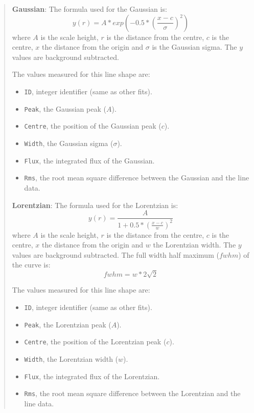 \documentclass[twoside,11pt]{article}
\renewcommand{\_}{\texttt{\symbol{95}}}
\newcommand{\labelitem}[1]{\textbf{#1}}
\newcommand{\hitext}[1]{\texttt{#1}}
\begin{document}
\begin{quote}
 \labelitem{Gaussian}: The formula used for the Gaussian is:
 \[
  y(r) = A * exp\left( -0.5 * \left(\frac{x-c}{\sigma}\right)^{2}\right)
 \]
 where $A$ is the scale height, $r$ is the distance from the centre,
 $c$ is the centre, $x$ the distance from the origin and $\sigma$ is
 the Gaussian sigma. The $y$ values are background subtracted.

 The values measured for this line shape are:
 \begin{itemize}
   \item \hitext{ID}, integer identifier (same as other fits).
   \item \hitext{Peak}, the Gaussian peak ($A$).
   \item \hitext{Centre}, the position of the Gaussian peak ($c$).
   \item \hitext{Width}, the Gaussian sigma ($\sigma$).
   \item \hitext{Flux}, the integrated flux of the Gaussian.
   \item \hitext{Rms}, the root mean square difference between the
         Gaussian and the line data.
 \end{itemize}

 \labelitem{Lorentzian}: The formula used for the Lorentzian is:
 \[
  y(r) = \frac{A}{1+0.5*(\frac{x-c}{w})^{2}}
 \]
 where $A$ is the scale height, $r$ is the distance from the centre,
 $c$ is the centre, $x$ the distance from the origin and $w$ the
 Lorentzian width. The $y$ values are background subtracted. The full
 width half maximum ($fwhm$) of the curve is:
 \[
 fwhm = w*2\sqrt{2}
 \]

 The values measured for this line shape are:
 \begin{itemize}
   \item \hitext{ID}, integer identifier (same as other fits).
   \item \hitext{Peak}, the Lorentzian peak ($A$).
   \item \hitext{Centre}, the position of the Lorentzian peak ($c$).
   \item \hitext{Width}, the Lorentzian width ($w$).
   \item \hitext{Flux}, the integrated flux of the Lorentzian.
   \item \hitext{Rms}, the root mean square difference between the
         Lorentzian and the line data.
 \end{itemize}


\end{quote}
\end{document}
